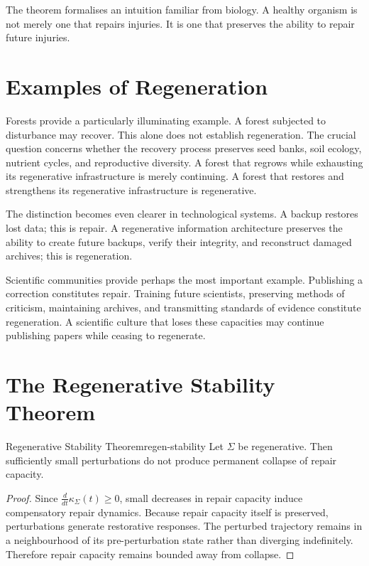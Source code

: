 \documentclass[12pt,twoside,openright]{book}
\begin{document}
The theorem formalises an intuition familiar from biology.
A healthy organism is not merely one that repairs injuries.
It is one that preserves the ability to repair future
injuries.

\section{Examples of Regeneration}
\label{sec:ch11-examples}

Forests provide a particularly illuminating example. A
forest subjected to disturbance may recover. This alone does
not establish regeneration. The crucial question concerns
whether the recovery process preserves seed banks, soil
ecology, nutrient cycles, and reproductive diversity. A
forest that regrows while exhausting its regenerative
infrastructure is merely continuing. A forest that restores
and strengthens its regenerative infrastructure is
regenerative.

The distinction becomes even clearer in technological
systems. A backup restores lost data; this is repair. A
regenerative information architecture preserves the ability
to create future backups, verify their integrity, and
reconstruct damaged archives; this is regeneration.

Scientific communities provide perhaps the most important
example. Publishing a correction constitutes repair.
Training future scientists, preserving methods of
criticism, maintaining archives, and transmitting standards
of evidence constitute regeneration. A scientific culture
that loses these capacities may continue publishing papers
while ceasing to regenerate.

\section{The Regenerative Stability Theorem}
\label{sec:ch11-stability}

\begin{theorem}{Regenerative Stability Theorem}{regen-stability}
  Let $\Sigma$ be regenerative. Then sufficiently small
  perturbations do not produce permanent collapse of repair
  capacity.
\end{theorem}

\begin{proof}
  Since $\frac{d}{dt}\kappa_\Sigma(t)\ge0$, small decreases
  in repair capacity induce compensatory repair dynamics.
  Because repair capacity itself is preserved, perturbations
  generate restorative responses. The perturbed trajectory
  remains in a neighbourhood of its pre-perturbation state
  rather than diverging indefinitely. Therefore repair
  capacity remains bounded away from collapse.
\end{proof}
\end{document}
